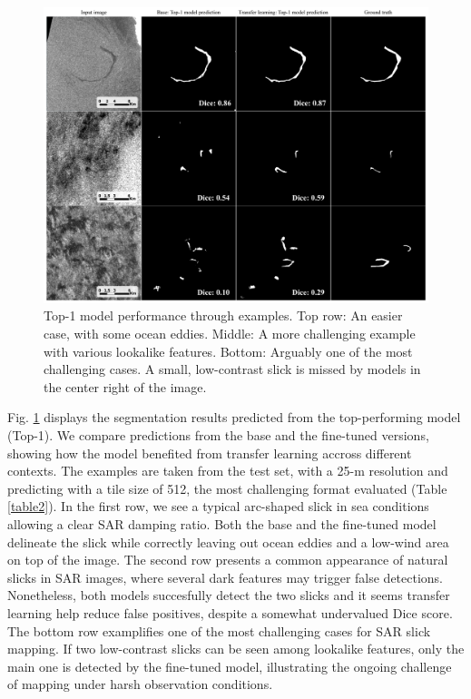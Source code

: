 \documentclass[journal]{IEEEtran}
\begin{document}
\begin{figure}[!t]
    \centering
    \includegraphics[width=6.2in]{figures/preds4x3_v2_scale.png}
    \caption{Top-1 model performance through examples. \quad Top row: An easier case, with some ocean eddies. \quad Middle: A more challenging example with 
    various lookalike features. \quad Bottom: Arguably one of the most challenging cases. A small, low-contrast slick is missed by models in the center right of the image.}
    \label{figure3}
\end{figure}
Fig. \ref{figure3} displays the segmentation results predicted from the top-performing model (Top-1). We compare predictions from the base and the fine-tuned
versions, showing how the model benefited from transfer learning accross different contexts. The examples are taken from the test set, with a 25-m resolution and predicting 
with a tile size of 512, the most challenging format evaluated (Table \ref{table2}). In the first row, we see a typical arc-shaped slick in sea conditions allowing a clear SAR damping ratio. 
Both the base and the fine-tuned model delineate the slick while correctly leaving out ocean eddies and a low-wind area on top of the image. The second row presents a common appearance 
of natural slicks in SAR images, where several dark features may trigger false detections. Nonetheless, both models succesfully detect the two slicks and it seems transfer learning help reduce
false positives, despite a somewhat undervalued Dice score. The bottom row examplifies one of the most challenging cases for SAR slick mapping. If two low-contrast slicks can be seen among lookalike features,
only the main one is detected by the fine-tuned model, illustrating the ongoing challenge of mapping under harsh observation conditions. 
\end{document}

